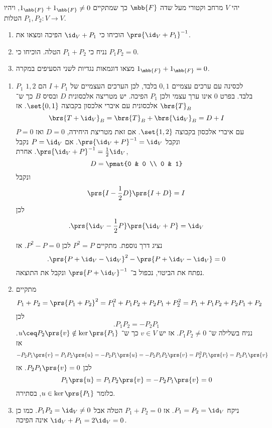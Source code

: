 \documentclass[a4paper,10pt,oneside,openany]{article}
\begin{document}
\begin{exercise}
יהי
$V$
מרחב וקטורי מעל שדה
$\mbb{F}$
כך שמתקיים
$1_{\mbb{F}} + 1_{\mbb{F}} \neq 0$,
ויהיו
$P_1, P_2 \colon V \to V$
הטלות.
\begin{enumerate}
\item הוכיחו כי
$\id_V + P_1$
הפיכה ומצאו את
$\prs{\id_V + P_1}^{-1}$.
\item נניח כי
$P_1 + P_2$
הטלה. הוכיחו כי
$P_1P_2 = 0$.
\item מצאו דוגמאות נגדיות לשני הסעיפים במקרה
$1_{\mbb{F}} + 1_{\mbb{F}} = 0$.
\end{enumerate}
\end{exercise}

\begin{solution}
\begin{enumerate}
\item
$P_1$
לכסינה עם ערכים עצמיים
$0,1$
בלבד, לכן הערכים העצמיים של
$I + P_1$
הם
$1,2$
בלבד. בפרט
$0$
אינו ערך עצמי ולכן
$P_1$
הפיכה.
יש מטריצה אלכסונית
$D$
ובסיס
$B$
כך ש־%
$\brs{T}_B$
אלכסונית עם איברי אלכסון בקבוצה
$\set{0,1}$.
אז
\[\brs{T + \id_V}_B = \brs{T}_B + \brs{\id_V}_B = D + I\]
עם איברי אלכסון בקבוצה
$\set{1,2}$.
אם זאת מטריצת היחידה,
$D = 0$
ואז
$P = 0$
ונקבל
$\prs{\id_V+P}^{-1} = \id_V$.
אם
$P = \id_V$
נקבל
$\prs{\id_V + P}^{-1} = \frac{1}{2} \id_V$.
אחרת,
\[D = \pmat{0 & 0 \\ 0 & 1}\]
ונקבל
\[\prs{I - \frac{1}{2} D} \prs{I + D} = I\]
לכן
\[\text{.} \prs{\id_V - \frac{1}{2} P}\prs{\id_V + P} = \id_V\]

נציג דרך נוספת.
מתקיים
$P^2 = P$
לכן
$P^2 - P = 0$.
אז
\[\text{.} \prs{P + \id_V - \id_V}^2 - \prs{P + \id_V - \id_V} = 0\]
נפתח את הביטוי, נכפול ב־%
$\prs{P + \id_V}^{-1}$
ונקבל את התוצאה.
\item מתקיים
\[P_1 + P_2 = \prs{P_1 + P_2}^2 = P_1^2 + P_1 P_2 + P_2 P_1 + P_2^2 = P_1 + P_1 P_2 + P_2 P_1 + P_2\]
לכן
\[\text{.} P_1 P_2 = - P_2 P_1\]
נניח בשלילה ש־%
$P_1 P_2 \neq 0$.
אז יש
$v \in V$
כך ש־%
$u \ceq P_2\prs{v} \notin \ker\prs{P_1}$.
אז
\[-P_2P_1\prs{v} = P_1 P_2 \prs{u} = - P_2 P_1\prs{u} = -P_2 P_1 P_2 \prs{v} = P_2^2 P_1\prs{v} = P_2 P_1\prs{v}\]
לכן
$P_2 P_1\prs{v} = 0$.
אז
\[P_1\prs{u} = P_1 P_2\prs{v} = -P_2 P_1\prs{v} = 0\]
כלומר
$u \in \ker\prs{P_1}$,
בסתירה.
\item
ניקח
$P_1 = P_2 = \id_V$.
אז
$P_1 + P_2 = 0$
הטלה אבל
$P_1 P_2 = \id_V \neq 0$.
כמו כן
$\id_V + P_1 = 2\id_V = 0$
אינה הפיכה.

\end{enumerate}
\end{solution}
\end{document}
